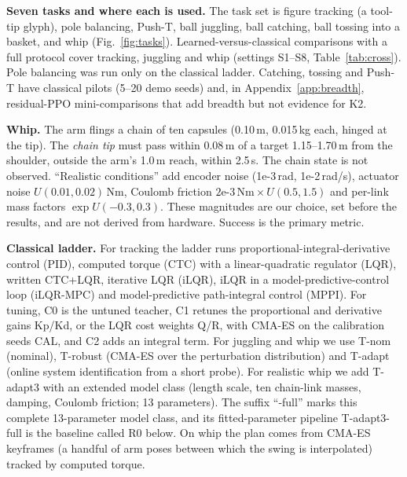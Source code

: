 \textbf{Seven tasks and where each is used.} The task set is figure tracking (a tool-tip glyph), pole balancing, Push-T, ball juggling, ball catching, ball tossing into a basket, and whip (Fig.~\ref{fig:tasks}). Learned-versus-classical comparisons with a full protocol cover tracking, juggling and whip (settings S1--S8, Table~\ref{tab:cross}). Pole balancing was run only on the classical ladder. Catching, tossing and Push-T have classical pilots (5--20 demo seeds) and, in Appendix~\ref{app:breadth}, residual-PPO mini-comparisons that add breadth but not evidence for K2.

\textbf{Whip.} The arm flings a chain of ten capsules (0.10\,m, 0.015\,kg each, hinged at the tip). The \emph{chain tip} must pass within 0.08\,m of a target 1.15--1.70\,m from the shoulder, outside the arm's 1.0\,m reach, within 2.5\,s. The chain state is not observed. ``Realistic conditions'' add encoder noise (1e-3\,rad, 1e-2\,rad/s), actuator noise $U(0.01, 0.02)$\,Nm, Coulomb friction $2\text{e-}3\,\text{Nm} \times U(0.5, 1.5)$ and per-link mass factors $\exp U(-0.3, 0.3)$. These magnitudes are our choice, set before the results, and are not derived from hardware. Success is the primary metric.

\textbf{Classical ladder.} For tracking the ladder runs proportional-integral-derivative control (PID), computed torque (CTC) with a linear-quadratic regulator (LQR), written CTC+LQR, iterative LQR (iLQR), iLQR in a model-predictive-control loop (iLQR-MPC) and model-predictive path-integral control (MPPI). For tuning, C0 is the untuned teacher, C1 retunes the proportional and derivative gains Kp/Kd, or the LQR cost weights Q/R, with CMA-ES on the calibration seeds CAL, and C2 adds an integral term. For juggling and whip we use T-nom (nominal), T-robust (CMA-ES over the perturbation distribution) and T-adapt (online system identification from a short probe). For realistic whip we add T-adapt3 with an extended model class (length scale, ten chain-link masses, damping, Coulomb friction; 13 parameters). The suffix ``-full'' marks this complete 13-parameter model class, and its fitted-parameter pipeline T-adapt3-full is the baseline called R0 below. On whip the plan comes from CMA-ES keyframes (a handful of arm poses between which the swing is interpolated) tracked by computed torque.

